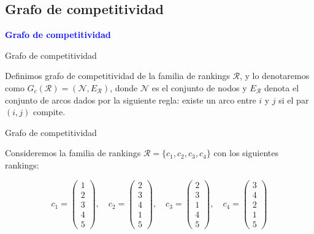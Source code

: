 \documentclass[10pt,hyperref={unicode}]{beamer}
\begin{document}
	\subsection{Grafo de competitividad}
	
	\begin{frame}
		\begin{center}
			\Huge\textbf{\textsf{\textcolor{blue}{Grafo de competitividad}}}
		\end{center}
	\end{frame}
	
	\begin{frame}{Grafo de competitividad}
		\begin{defi}
			Definimos grafo de competitividad de la familia de rankings $\mathcal{R}$, y lo denotaremos como $G_c(\mathcal{R}) = (\mathcal{N}, E_\mathcal{R})$, donde $\mathcal{N}$ es el conjunto de nodos y $E_\mathcal{R}$ denota el conjunto de arcos dados por la siguiente regla: existe un arco entre $i$ y $j$ si el par $(i,j)$ compite.
		\end{defi}
	\end{frame}
	
	\begin{frame}{Grafo de competitividad}
		\begin{ejemplo}
			Consideremos la familia de rankings $\mathcal{R} = \{c_1, c_2, c_3, c_4\}$ con los siguientes rankings:
			
			\begin{equation*}
			c_1 = \left( \begin{array}{c}
			1 \\
			2 \\
			3 \\
			4 \\
			5
			\end{array} \right), \quad
			c_2 = \left( \begin{array}{c}
			2 \\
			3 \\
			4 \\
			1 \\
			5
			\end{array} \right), \quad
			c_3 = \left( \begin{array}{c}
			2 \\
			3 \\
			1 \\
			4 \\
			5
			\end{array} \right), \quad
			c_4 = \left( \begin{array}{c}
			3 \\
			4 \\
			2 \\
			1 \\
			5
			\end{array} \right)
			\end{equation*}
		
		\end{ejemplo}
	\end{frame}
	
\end{document}
